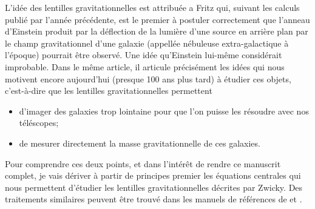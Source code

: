 

L'idée des lentilles gravitationnelles est attribuée a Fritz \citet{Zwicky1937} %
qui, suivant les calculs publié par \citet{Einstein1936} l'année précédente, %
est le premier à postuler correctement que l'anneau d'Einstein produit par la déflection 
de la lumière d'une source en arrière plan par le champ gravitationnel d'une galaxie 
(appellée nébuleuse extra-galactique à l'époque) 
pourrait être observé. Une idée qu'Einstein lui-même considérait improbable. 
Dans le même article, il articule précisément les idées qui nous motivent encore aujourd'hui 
(presque 100 ans plus tard) à étudier ces objets, 
c'est-à-dire que les lentilles gravitationnelles permettent
\begin{itemize}
        \item d'imager des galaxies trop lointaine pour que l'on puisse les résoudre avec 
                nos téléscopes;
        \item de mesurer directement la masse gravitationnelle de ces galaxies.
\end{itemize}
Pour comprendre ces deux points, 
et dans l'intérêt de rendre ce manuscrit complet, je vais dériver à partir de principes 
premier les équations 
centrales qui nous permettent d'étudier les lentilles gravitationnelles décrites par 
Zwicky.
Des traitements similaires 
peuvent être trouvé dans les manuels de références de \citet{Meneghetti2013} et 
\citet{Carroll2003}.



